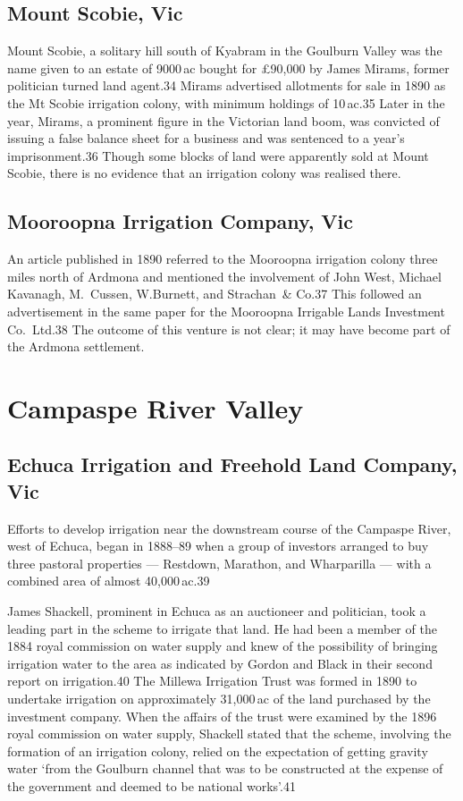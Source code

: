 \subsection{Mount Scobie, Vic}

Mount Scobie, a solitary hill south of Kyabram in the Goulburn Valley
was the name given to an estate of 9000\,ac bought for \pounds90,000
by James Mirams, former politician turned land agent.34 Mirams
advertised allotments for sale in 1890 as the Mt Scobie irrigation
colony, with minimum holdings of 10\,ac.35 Later in the year, Mirams,
a prominent figure in the Victorian land boom, was convicted of
issuing a false balance sheet for a business and was sentenced to a
year's imprisonment.36 Though some blocks of land were apparently sold
at Mount Scobie, there is no evidence that an irrigation colony was
realised there.

\subsection{Mooroopna Irrigation Company, Vic}

An article published in 1890 referred to the Mooroopna irrigation
colony three miles north of Ardmona and mentioned the involvement of
John West, Michael Kavanagh, M.~Cussen, W.Burnett, and Strachan~\&
Co.37 This followed an advertisement in the same paper for the
Mooroopna Irrigable Lands Investment Co.\ Ltd.38 The outcome of this
venture is not clear; it may have become part of the Ardmona
settlement.

\section{Campaspe River Valley}

\subsection{Echuca Irrigation and Freehold Land Company, Vic}

Efforts to develop irrigation near the downstream course of the
Campaspe River, west of Echuca, began in 1888--89 when a group of
investors arranged to buy three pastoral properties --- Restdown,
Marathon, and Wharparilla --- with a combined area of almost
40,000\,ac.39

James Shackell, prominent in Echuca as an auctioneer and politician,
took a leading part in the scheme to irrigate that land.  He had been
a member of the 1884 royal commission on water supply and knew of the
possibility of bringing irrigation water to the area as indicated by
Gordon and Black in their second report on irrigation.40 The Millewa
Irrigation Trust was formed in 1890 to undertake irrigation on
approximately 31,000\,ac of the land purchased by the investment
company. When the affairs of the trust were examined by the 1896 royal
commission on water supply, Shackell stated that the scheme, involving
the formation of an irrigation colony, relied on the expectation of
getting gravity water `from the Goulburn channel that was to be
constructed at the expense of the government and deemed to be national
works'.41

